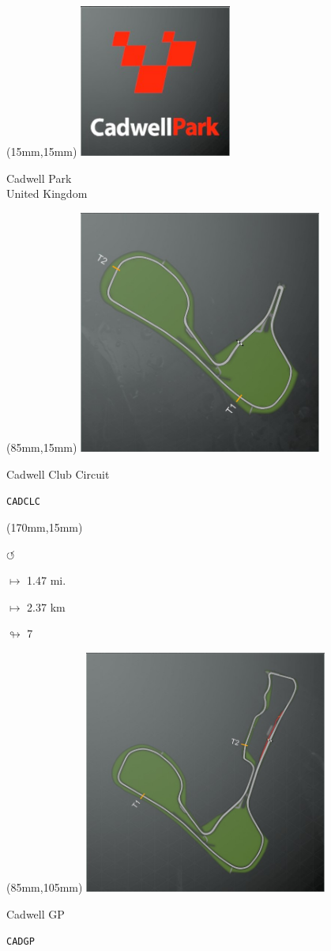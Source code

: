 \begin{textblock*}{60mm}(15mm,15mm)%
\includegraphics[width=50mm]{LG/2015-05-20_00076.png}
\par Cadwell Park\\ United Kingdom
\end{textblock*}
\begin{textblock*}{80mm}(85mm,15mm)%
\includegraphics[width=80mm]{TR/2015-05-20_00011.png}
\centerline{Cadwell Club Circuit}
\par\hfill\tiny\tt CADCLC\\
\end{textblock*}
\begin{textblock*}{30mm}(170mm,15mm)%
\par \Huge$\circlearrowleft$
\Large
\par$\mapsto$ 1.47 mi.
\par$\mapsto$ 2.37 km
\par$\looparrowright$ 7
\end{textblock*}
\begin{textblock*}{80mm}(85mm,105mm)%
\includegraphics[width=80mm]{TR/2015-05-20_00010.png}
\centerline{Cadwell GP}
\par\hfill\tiny\tt CADGP\\
\end{textblock*}
